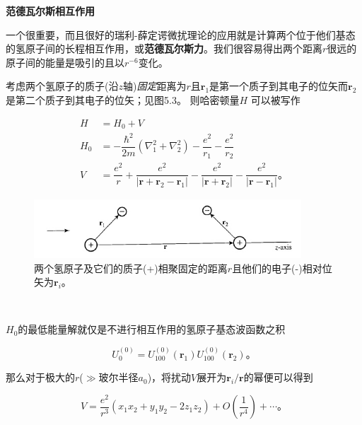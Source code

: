 ﻿\documentclass[UTF8,twoside]{ctexart}
\begin{document}
\noindent \textbf{范德瓦尔斯相互作用}

\noindent 一个很重要，而且很好的瑞利-薛定谔微扰理论的应用就是计算两个位于他们基态的氢原子间的长程相互作用，或{\textbf{范德瓦尔斯力}}。我们很容易得出两个距离$r$很远的原子间的能量是吸引的且以$r^{-6}$变化。

考虑两个氢原子的质子(沿$z$轴)\emph{固定}距离为$r$且$\boldsymbol{r}_1$是第一个质子到其电子的位矢而$\boldsymbol{r}_2$是第二个质子到其电子的位矢；见图5.3。 则哈密顿量$H$ 可以被写作

\begin{equation} \label{5.3.53}
\begin{split}
H &=H_0+V \\
H_0 &=-\dfrac{\hbar^2}{2m}(\nabla_1^2+\nabla_2^2)-\dfrac{e^2}{r_1}-\dfrac{e^2}{r_2} \\
V &=\dfrac{e^2}{r}+\dfrac{e^2}{|\boldsymbol{r}+\boldsymbol{r}_2-\boldsymbol{r}_1|} -\dfrac{e^2}{|\boldsymbol{r}+\boldsymbol{r}_2|}- \dfrac{e^2}{|\boldsymbol{r}-\boldsymbol{r}_1|}\text{。}
\end{split}
\end{equation}

\begin{figure}
\begin{centering}
\includegraphics[width = 10cm]{./Graph/5.3.jpg}
\caption{两个氢原子及它们的质子(+)相聚固定的距离$r$且他们的电子(-)相对位矢为$\boldsymbol{r}_i$。}
\label {Figure 5.3}
\end{centering}
\end{figure}

\

\noindent $H_0$的最低能量解就仅是不进行相互作用的氢原子基态波函数之积

\begin{equation} \label{5.3.54}
U_0^{(0)}=U_{100}^{(0)}(\boldsymbol{r}_1)U_{100}^{(0)}(\boldsymbol{r}_2)\text{。}
\end{equation}

\noindent 那么对于极大的$r$($\gg$玻尔半径$a_0$)，将扰动$V$展开为$\boldsymbol{r}_i/\boldsymbol{r}$的幂便可以得到

\begin{equation} \label{5.3.55}
V=\dfrac{e^2}{r^3}(x_1x_2+y_1y_2-2z_1z_2)+O\left(\dfrac{1}{r^4}\right)+\cdots\text{。}
\end{equation}
\end{document}
